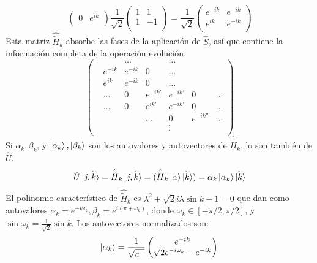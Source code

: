 \begin{appendix}
\begin{equation*}
\begin{pmatrix}
0 & e^{ik}\\
\end{pmatrix}
\frac{1}{\sqrt{2}}
\begin{pmatrix}
1 & 1\\
1 & -1\\
\end{pmatrix}
=\frac{1}{\sqrt{2}}
\begin{pmatrix}
e^{-ik} & e^{-ik}\\
e^{ik} & e^{-ik}\\
\end{pmatrix}
\end{equation*}{}
Esta matriz $\hat{\widetilde{H}}_k$ absorbe las fases de la aplicación de $\hat{S}$, así que contiene la información completa de la operación evolución. 
\begin{equation}
\begin{pmatrix}
 &&\dots&&\dots\\
 & e^{-ik} & e^{-ik} & 0   & \dots & \\
& e^{ik}  & e^{-ik} & 0     & \dots\\
& \dots  & 0     & e^{-ik'}& e^{-ik'} &0  &\dots\\
&  \dots   & 0     & e^{ik'} & e^{-ik'} & 0 &  \dots\\
&      &     & \dots & 0 & e^{-ik''} & \dots \\
&  &  & & \vdots \\
\end{pmatrix}
\end{equation}{}
Si $\alpha_k,\beta_k$, y $\ket{\alpha_k},\ket{\beta_k}$ son los autovalores y autovectores de $\hat{\widetilde{H}}_k$, lo son también de $\hat{U}$.
\begin{equation}
    \hat{U}\ket{j,\widetilde{k}}=\hat{\widetilde{H}}_k\ket{j,\widetilde{k}}=(\hat{\widetilde{H}}_k\ket{\alpha}\ket{\widetilde{k}})=\alpha_k\ket{\alpha_k}\ket{\widetilde{k}}
\end{equation}{}
El polinomio característico de $\hat{\widetilde{H}}_k$ es $\lambda^2+\sqrt{2}i\lambda\sin{k}-1=0$ que dan como autovalores $\alpha_k=e^{-i\omega_k},\beta_k=e^{i(\pi+\omega_k)}$, donde $\omega_k\in[-\pi/2,\pi/2]$, y $\sin\omega_k=\frac{1}{\sqrt{2}}\sin k$. Los autovectores normalizados son:
\begin{align}
    \ket{\alpha_k}=\frac{1}{\sqrt{c^-}}
    \begin{pmatrix}
    e^{-ik}\\
    \sqrt{2}e^{-i\omega_k}-e^{-ik}
    \end{pmatrix}{}
    \label{AutoVector1}

\end{align}
\end{appendix}
